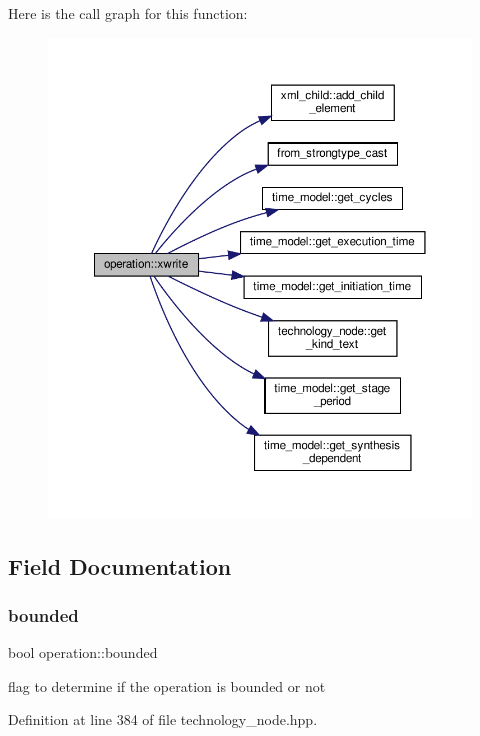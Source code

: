 Here is the call graph for this function\+:
\nopagebreak
\begin{figure}[H]
\begin{center}
\leavevmode
\includegraphics[width=350pt]{d9/dc0/structoperation_a5edb965df8d7b05e912feabfbfe1306b_cgraph}
\end{center}
\end{figure}


\subsection{Field Documentation}
\mbox{\label{structoperation_a34c154bf0f9db4968c37f6770be3b58f}} 
\subsubsection{\texorpdfstring{bounded}{bounded}}
{\footnotesize\ttfamily bool operation\+::bounded}



flag to determine if the operation is bounded or not 



Definition at line 384 of file technology\+\_\+node.\+hpp.




